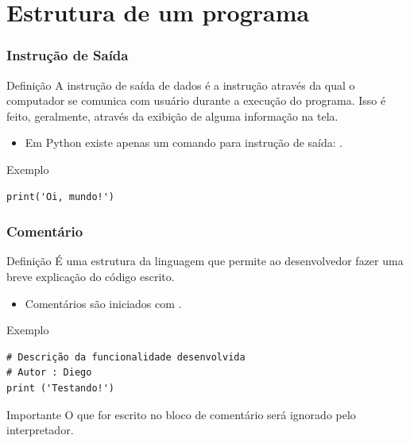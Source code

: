 \documentclass{beamer}
\begin{document}
\section{Estrutura de um programa}

\begin{frame}[fragile]
\frametitle{Instrução de Saída}

\begin{block}{Definição}
	A instrução de saída de dados é a instrução através da qual o computador se comunica com usuário durante a execução do programa. Isso é feito, geralmente, através da exibição de alguma informação na tela.
\end{block}\vfill

\begin{itemize}
	\item Em Python existe apenas um comando para instrução de saída: .
\end{itemize}\vfill

\begin{exampleblock}{Exemplo}
\begin{lstlisting}
print('Oi, mundo!')
\end{lstlisting}
\end{exampleblock}
\end{frame}

\begin{frame}[fragile]
\frametitle{Comentário}

\begin{block}{Definição}
É uma estrutura da linguagem que permite ao desenvolvedor fazer uma breve explicação do código escrito.
\end{block}\vfill

\begin{itemize}
	\item Comentários são iniciados com \structure{\#}.
\end{itemize}\vfill

\begin{exampleblock}{Exemplo}
	\begin{lstlisting}
# Descrição da funcionalidade desenvolvida
# Autor : Diego
print ('Testando!')
	\end{lstlisting}
\end{exampleblock}\vfill

\begin{alertblock}{Importante}
O que for escrito no bloco de comentário será ignorado pelo interpretador.
\end{alertblock}
\end{frame}
\end{document}
